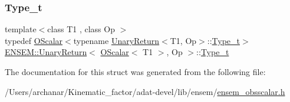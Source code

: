 \subsubsection{\texorpdfstring{Type\_t}{Type\_t}\hspace{0.1cm}{\footnotesize\ttfamily [3/3]}}
{\footnotesize\ttfamily template$<$class T1 , class Op $>$ \\
typedef \mbox{\hyperlink{classENSEM_1_1OScalar}{O\+Scalar}}$<$typename \mbox{\hyperlink{structENSEM_1_1UnaryReturn}{Unary\+Return}}$<$T1, Op$>$\+::\mbox{\hyperlink{structENSEM_1_1UnaryReturn_3_01OScalar_3_01T1_01_4_00_01Op_01_4_a726cb7ab3c097ee6c39cffe7663a39b1}{Type\+\_\+t}}$>$ \mbox{\hyperlink{structENSEM_1_1UnaryReturn}{E\+N\+S\+E\+M\+::\+Unary\+Return}}$<$ \mbox{\hyperlink{classENSEM_1_1OScalar}{O\+Scalar}}$<$ T1 $>$, Op $>$\+::\mbox{\hyperlink{structENSEM_1_1UnaryReturn_3_01OScalar_3_01T1_01_4_00_01Op_01_4_a726cb7ab3c097ee6c39cffe7663a39b1}{Type\+\_\+t}}}



The documentation for this struct was generated from the following file\+:\begin{DoxyCompactItemize}
\item 
/\+Users/archanar/\+Kinematic\+\_\+factor/adat-\/devel/lib/ensem/\mbox{\hyperlink{adat-devel_2lib_2ensem_2ensem__obsscalar_8h}{ensem\+\_\+obsscalar.\+h}}\end{DoxyCompactItemize}
